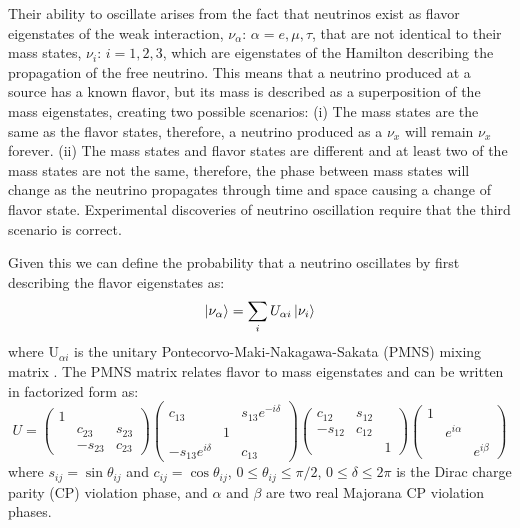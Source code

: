 Their ability to oscillate arises from the fact that neutrinos exist as flavor eigenstates of the weak interaction, $\nu_\alpha$: $\alpha = e, \mu, \tau$, that are not identical to their mass states, $\nu_i$: $i = 1, 2, 3$, which are eigenstates of the Hamilton describing the propagation of the free neutrino.
This means that a neutrino produced at a source has a known flavor, but its mass is described as a superposition of the mass eigenstates, creating two possible scenarios:
(i) The mass states are the same as the flavor states, therefore, a neutrino produced as a $\nu_x$ will remain $\nu_x$ forever. 
(ii) The mass states and flavor states are different and at least two of the mass states are not the same, therefore, the phase between mass states will change as the neutrino propagates through time and space causing a change of flavor state.
Experimental discoveries of neutrino oscillation require that the third scenario is correct.

Given this we can define the probability that a neutrino oscillates by first describing the flavor eigenstates as:
\begin{equation}
	\ket{\nu_\alpha} = \sum_{i}U_{\alpha i}\ket{\nu_i}
\end{equation}
where U$_{\alpha i}$ is the unitary Pontecorvo-Maki-Nakagawa-Sakata (PMNS) mixing matrix \cite{PDG}. 
The PMNS matrix relates flavor to mass eigenstates and can be written in factorized form as:
\begin{equation}	
	U = 
	\begin{pmatrix}
		1 & & \\
		& c_{23} & s_{23} \\
		& -s_{23} & c_{23}
	\end{pmatrix}
	\begin{pmatrix}
		c_{13} & & s_{13}e^{-i\delta} \\
		& 1 &	\\
		-s_{13}e^{i\delta} & & c_{13}
	\end{pmatrix}
	\begin{pmatrix}
		c_{12} & s_{12} & \\
		-s_{12} & c_{12} & \\
		& & 1
	\end{pmatrix}
	\begin{pmatrix}
		1 & & \\
		& e^{i\alpha}  & \\
		& & e^{i\beta}
	\end{pmatrix}
\end{equation}
where $s_{ij} = \sin\theta_{ij}$ and $c_{ij} = \cos\theta_{ij}$, $0 \leq \theta_{ij} \leq \pi/2$, $0 \leq \delta \leq 2\pi$ is the Dirac charge parity (CP) violation phase, and $\alpha$ and $\beta$ are two real Majorana CP violation phases.


